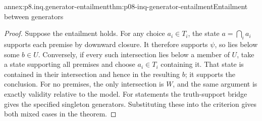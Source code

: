 \begin{annexitem}{annex:p8.inq.generator-entailment}{thm:p08-inq-generator-entailment}{Entailment between generators}
\begin{proof}
Suppose the entailment holds. For any choice \(a_i\in T_i\), the state
\(a=\bigcap_i a_i\) supports each premise by downward closure. It therefore
supports \(\psi\), so lies below some \(b\in U\). Conversely, if every
such intersection lies below a member of \(U\), take a state supporting
all premises and choose \(a_i\in T_i\) containing it. That state is contained
in their intersection and hence in the resulting \(b\); it supports the
conclusion. For no premises, the only intersection is \(W\), and the same
argument is exactly validity relative to the model. For statements the
truth-support bridge gives the specified singleton generators. Substituting
these into the criterion gives both mixed cases in the theorem.
\end{proof}
\end{annexitem}

